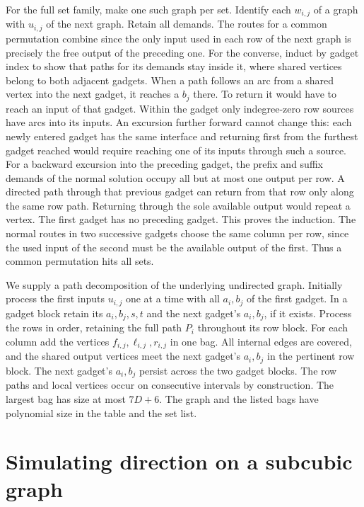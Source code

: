\documentclass[11pt]{article}
\begin{document}
For the full set family, make one such graph per set. Identify each
\(w_{i,j}\) of a graph with \(u_{i,j}\) of the next graph. Retain all demands.
The routes for a common permutation combine since the only input used in
each row of the next graph is precisely the free output of the preceding
one. For the converse, induct by gadget index to show that paths for its
demands stay inside it, where shared vertices belong to both adjacent
gadgets. When a path follows an arc from a shared vertex into the next
gadget, it reaches a \(b_j\) there. To return it would have to reach an
input of that gadget. Within the gadget only indegree-zero row sources have
arcs into its inputs. An excursion further forward cannot change this:
each newly entered gadget has the same interface and returning first from
the furthest gadget reached would require reaching one of its inputs
through such a source.
For a backward excursion into the preceding gadget, the prefix and suffix
demands of the normal solution occupy all but at most one output per row.
A directed path through that previous gadget can return from that
row only along the same row path. Returning through the sole available
output would repeat a vertex. The first gadget has no preceding gadget.
This proves the induction. The normal routes in two successive gadgets
choose the same column per row, since the used input of the second must
be the available output of the first. Thus a common permutation hits all
sets.

We supply a path decomposition of the underlying undirected graph. Initially
process the first inputs \(u_{i,j}\) one at a time with all \(a_i,b_j\) of
the first gadget. In a gadget block retain its \(a_i,b_j,s,t\) and the
next gadget's \(a_i,b_j\), if it exists. Process the rows in order, retaining
the full path \(P_i\) throughout its row block. For each column add the
vertices \(f_{i,j},\ell_{i,j},r_{i,j}\) in one bag. All internal edges are
covered, and the shared output vertices meet the next gadget's \(a_i,b_j\)
in the pertinent row block. The next gadget's \(a_i,b_j\) persist across
the two gadget blocks. The row paths and local vertices occur on consecutive intervals by
construction. The largest bag has size at most \(7D+6\). The graph and the
listed bags have polynomial size in the table and the set list.

\section{Simulating direction on a subcubic graph}
\end{document}
